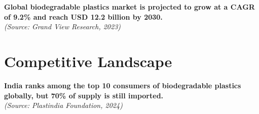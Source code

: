 
\noindent\textcolor{orange} {\faFileText\quad}  \textbf{Global biodegradable plastics market is projected to grow at a CAGR of 9.2\% and reach USD 12.2 billion by 2030.} \\
\textit{(Source: Grand View Research, 2023)}


\vspace{0.8cm}

\section{Competitive Landscape}

\noindent\textcolor{blue}{\faFileText\quad} \textbf{India ranks among the top 10 consumers of biodegradable plastics globally, but 70\% of supply is still imported.} \\
\textit{(Source: Plastindia Foundation, 2024)}


